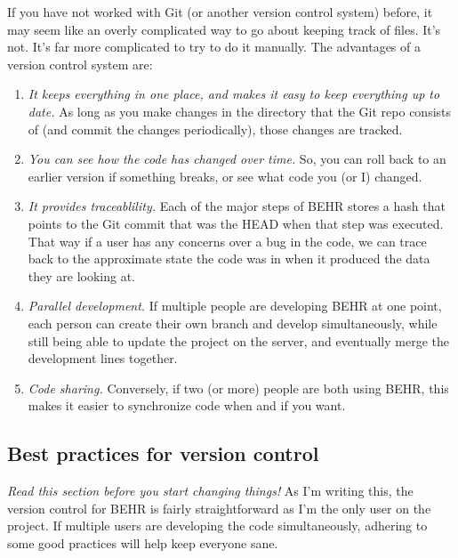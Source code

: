 \documentclass[12pt]{article}
\begin{document}
	If you have not worked with Git (or another version control system) before, it may seem like an overly complicated way to go about keeping track of files. It's not. It's far more complicated to try to do it manually. The advantages of a version control system are:
	
	\begin{enumerate}
	 \item \emph{It keeps everything in one place, and makes it easy to keep everything up to date.} As long as you make changes in the directory that the Git repo consists of (and commit the changes periodically), those changes are tracked.  
	 \item \emph{You can see how the code has changed over time.} So, you can roll back to an earlier version if something breaks, or see what code you (or I) changed.
	 \item \emph{It provides traceablility.} Each of the major steps of BEHR stores a hash that points to the Git commit that was the HEAD when that step was executed. That way if a user has any concerns over a bug in the code, we can trace back to the approximate state the code was in when it produced the data they are looking at.
	 \item \emph{Parallel development.}  If multiple people are developing BEHR at one point, each person can create their own branch and develop simultaneously, while still being able to update the project on the server, and eventually merge the development lines together.
	 \item \emph{Code sharing.} Conversely, if two (or more) people are both using BEHR, this makes it easier to synchronize code when and if you want.
	\end{enumerate}
	
	\subsection{Best practices for version control}\label{sec:vers-con:best-practices}
	\emph{Read this section before you start changing things!} As I'm writing this, the version control for BEHR is fairly straightforward as I'm the only user on the project. If multiple users are developing the code simultaneously, adhering to some good practices will help keep everyone sane.
	
\end{document}
